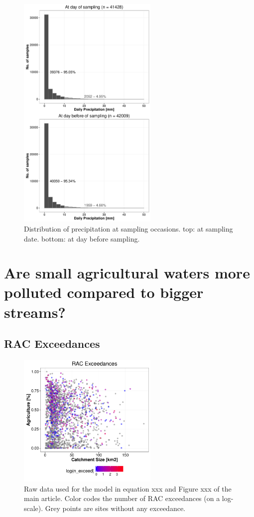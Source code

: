 \documentclass[pdftex,a4paper]{scrreprt}
\begin{document}
\begin{figure}[h]
	\centering
	\includegraphics[width = 0.6\textwidth]{precip}
	\caption{Distribution of precipitation at sampling occasions. top: at sampling date. bottom: at day before sampling.}
	\label{fig:precip}
\end{figure}


\chapter{Are small agricultural waters more polluted compared to bigger streams?}

\section{RAC Exceedances}
\begin{figure}[h]
	\centering
	\includegraphics[width = 0.6\textwidth]{ezgagrirac}
	\caption{Raw data used for the model in equation xxx and Figure xxx of the main article. Color codes the number of RAC exceedances (on a log-scale). Grey points are sites without any exceedance.}
	\label{fig:ezgagrirac}
\end{figure}
\end{document}
